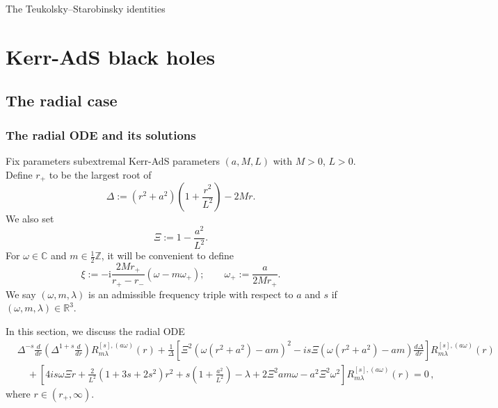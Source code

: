 \documentclass[11pt]{article}
\newcommand{\ii}{\mathrm{i}}
\numberwithin{equation}{section}
\begin{document}
\begin{center}
{\Large The Teukolsky--Starobinsky identities}\\[3pt]
\end{center}

\section{Kerr-AdS black holes}

\subsection{The radial case}

\subsubsection{The radial ODE and its solutions}

Fix parameters subextremal Kerr-AdS parameters $(a,M,L)$ with $M>0$, $L>0$. Define $r_+$ to be the largest root of 
\begin{equation} \label{eq:Delta-KAdS}
\Delta:=(r^2+a^2)\left(1+\frac{r^2}{L^2}\right)-2Mr.
\end{equation}
We also set
\begin{equation} \label{eq:Xi-KAdS}
\Xi:=1-\frac{a^2}{L^2}.
\end{equation}
For $\omega\in \mathbb C$ and $m\in \frac12\mathbb Z$, it will be convenient to define
\begin{equation}\label{eq:xi-KAdS}
        \xi:=-\ii\frac{2Mr_+}{r_+-r_-}(\omega-m\omega_+);\qquad 
        \omega_+:=\frac{a}{2Mr_+}.
\end{equation}
We say  $(\omega,m,\lambda)$ is an admissible frequency triple with respect to $a$ and $s$ if $(\omega,m,\lambda)\in \mathbb R^3$.

In this section, we discuss the radial ODE
\begin{equation}\label{eq:radial-ode-KAdS}
\begin{split}
&\Delta^{-s} \frac{d}{dr}\left(\Delta^{1+s}\frac{d}{dr}\right)R^{[s],(a\omega)}_{m\lambda}(r)+\frac{1}{\Delta}\left[\Xi^2(\omega(r^2+a^2)-am)^2 - is \Xi (\omega(r^2+a^2)-am) \frac{d\Delta}{dr}\right]R^{[s],(a\omega)}_{m\lambda}(r)\\
&\quad+\left[4is\omega \Xi r+\frac{2}{L^2}(1+3s+2s^2)r^2+s\left(1+\frac{a^2}{L^2}\right)-\lambda+2\Xi^2 am\omega-a^2\Xi^2\omega^2\right]R^{[s],(a\omega)}_{m\lambda}(r)=0\,,
\end{split}
\end{equation}
where $r\in (r_+,\infty)$.
\end{document}
